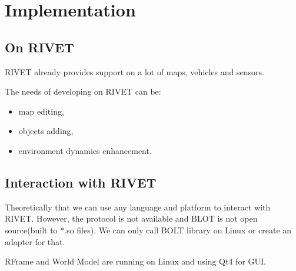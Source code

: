 \documentclass[12pt]{article}
\begin{document}
\section{Implementation}

\subsection{On RIVET}

RIVET already provides support on a lot of maps, vehicles and sensors.

The needs of developing on RIVET can be:
\begin{itemize}
\item map editing,
\item objects adding,
\item environment dynamics enhancement.
\end{itemize}

\subsection{Interaction with RIVET}
Theoretically that we can use any language and platform to interact with RIVET. However, the protocol is not available and BLOT is not open source(built to *.so files). We can only call BOLT library on Linux or create an adapter for that.

RFrame and World Model are running on Linux and using Qt4 for GUI. 



\end{document}
